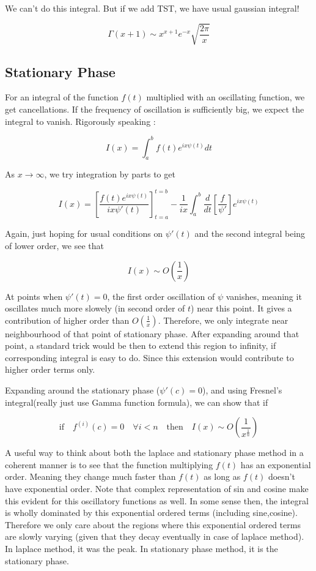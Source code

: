\documentclass{report}
\begin{document}
\noindent We can't do this integral. But if we add TST, we have usual gaussian integral!

$$\Gamma(x+1) \sim x^{x+1}e^{-x} \sqrt{\frac{2\pi}{x}}$$

\subsection{Stationary Phase}

For an integral of the function $f(t)$ multiplied with an oscillating function, we get cancellations. If the frequency of oscillation is sufficiently big, we expect the integral to vanish. Rigorously speaking :

$$I(x) = \int_{a}^{b}f(t)e^{ix\psi(t)}dt$$

\noindent As $x\to\infty$, we try integration by parts to get


$$I(x) = \left[\frac{f(t)e^{ix\psi(t)}}{ix\psi'(t)}\right]_{t=a}^{t=b} - \frac{1}{ix}\int_{a}^{b}\frac{d}{dt}\left[\frac{f}{\psi'}\right]e^{ix\psi(t)}$$

\noindent Again, just hoping for usual conditions on $\psi'(t)$ and the second integral being of lower order, we see that 

$$I(x) \sim O\left(\frac{1}{x}\right)$$

\noindent At points when $\psi'(t) = 0$, the first order oscillation of $\psi$ vanishes, meaning it oscillates much more slowely (in second order of $t$) near this point. It gives a contribution of higher order than $O(\frac{1}{x})$. Therefore, we only integrate near neighbourhood of that point of stationary phase. After expanding around that point, a standard trick would be then to extend this region to infinity, if corresponding integral is easy to do. Since this extension would contribute to higher order terms only.

\noindent Expanding around the stationary phase ($\psi'(c) =0 $), and using Fresnel's integral(really just use Gamma function formula), we can show that if 

$$\mathrm{if}\quad f^{(i)}(c) = 0 \quad\forall i<n \quad \mathrm{then} \quad  I(x) \sim O\left(\frac{1}{x^{\frac{1}{n}}}\right)$$

\noindent A useful way to think about both the laplace and stationary phase method in a coherent manner is to see that the function multiplying $f(t)$ has an exponential order. Meaning they change much faster than $f(t)$ as long as $f(t)$ doesn't have exponential order. Note that complex representation of sin and cosine make this evident for this oscillatory functions as well. In some sense then, the integral is wholly dominated by this exponential ordered terms (including sine,cosine). Therefore we only care about the regions where this exponential ordered terms are slowly varying (given that they decay eventually in case of laplace method). In laplace method, it was the peak. In stationary phase method, it is the stationary phase.\\
\end{document}
